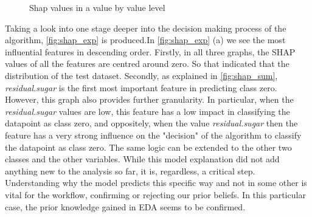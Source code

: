 \documentclass[11pt,twoside]{article}
\numberwithin{Theorem}{section}
\numberwithin{Definition}{section}
\numberwithin{Lemma}{section}
\numberwithin{Algorithm}{section}
\numberwithin{equation}{section}
\begin{document}
\begin{figure}[!h]
    \centering
    \caption{Shap values in a value by value level}
    \label{fig:shap_exp}
\end{figure}
Taking a look into one stage deeper into the decision making process of the algorithm, \autoref{fig:shap_exp} is produced.In \autoref{fig:shap_exp} (a) we see the most influential features in descending order.
Firstly, in all three graphs, the SHAP values of all the features are centred around zero. So that indicated that the distribution of the test dataset.
Secondly, as explained in \autoref{fig:shap_sum}, \textit{residual.sugar} is the first most important feature in predicting class zero. However, this graph also provides further granularity. In particular, when the \textit{residual.sugar} values are low, this feature has a low impact in classifying the datapoint as class zero, and oppositely, when the value \textit{residual.sugar} then the feature has a very strong influence on the "decision" of the algorithm to classify the datapoint as class zero. The same logic can be extended to the other two classes and the other variables.
While this model explanation did not add anything new to the analysis so far, it is, regardless, a critical step. Understanding why the model predicts this specific way and not in some other is vital for the workflow, confirming or rejecting our prior beliefs. In this particular case, the prior knowledge gained in EDA seems to be confirmed. 
\end{document}
